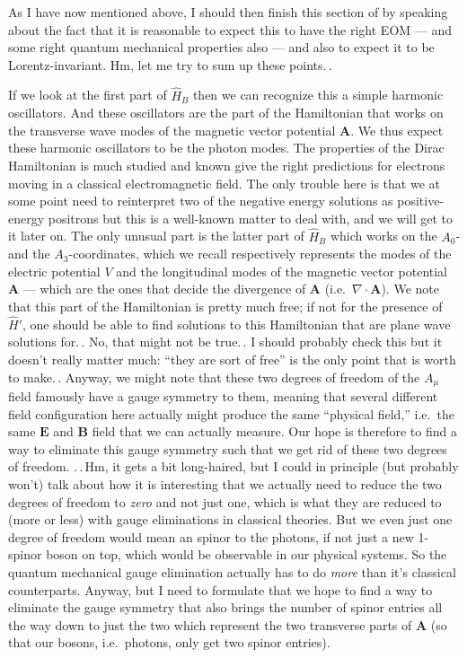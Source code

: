 \documentclass{report}
\begin{document}
As I have now mentioned above, I should then finish this section of by speaking about the fact that it is reasonable to expect this to have the right EOM --- and some right quantum mechanical properties also --- and also to expect it to be Lorentz-invariant. Hm, let me try to sum up these points.\,.

If we look at the first part of $\hat H_B$ then we can recognize this a simple harmonic oscillators. And these oscillators are the part of the Hamiltonian that works on the transverse wave modes of the magnetic vector potential $\boldsymbol{A}$. We thus expect these harmonic oscillators to be the photon modes. The properties of the Dirac Hamiltonian is much studied and known give the right predictions for electrons moving in a classical electromagnetic field. The only trouble here is that we at some point need to reinterpret two of the negative energy solutions as positive-energy positrons but this is a well-known matter to deal with, and we will get to it later on. The only unusual part is the latter part of $\hat H_B$ which works on the $A_0$- and the $A_3$-coordinates, which we recall respectively represents the modes of the electric potential $V$ and the longitudinal modes of the magnetic vector potential $\boldsymbol{A}$ --- which are the ones that decide the divergence of $\boldsymbol{A}$ (i.e.\ $\nabla \cdot \boldsymbol{A}$). We note that this part of the Hamiltonian is pretty much free; if not for the presence of $\hat H'$, one should be able to find solutions to this Hamiltonian that are plane wave solutions for.\,. No, that might not be true.\,. I should probably check this but it doesn't really matter much: ``they are sort of free'' is the only point that is worth to make.\,. Anyway, we might note that these two degrees of freedom of the $A_\mu$ field famously have a gauge symmetry to them, meaning that several different field configuration here actually might produce the same ``physical field,'' i.e.\ the same $\boldsymbol{E}$ and $\boldsymbol{B}$ field that we can actually measure. Our hope is therefore to find a way to eliminate this gauge symmetry such that we get rid of these two degrees of freedom. .\,.\,Hm, it gets a bit long-haired, but I could in principle (but probably won't) talk about how it is interesting that we actually need to reduce the two degrees of freedom to \emph{zero} and not just one, which is what they are reduced to (more or less) with gauge eliminations in classical theories. But we even just one degree of freedom would mean an spinor to the photons, if not just a new 1-spinor boson on top, which would be observable in our physical systems. So the quantum mechanical gauge elimination actually has to do \emph{more} than it's classical counterparts. Anyway, but I need to formulate that we hope to find a way to eliminate the gauge symmetry that also brings the number of spinor entries all the way down to just the two which represent the two transverse parts of $\boldsymbol{A}$ (so that our bosons, i.e.\ photons, only get two spinor entries). 
\end{document}
